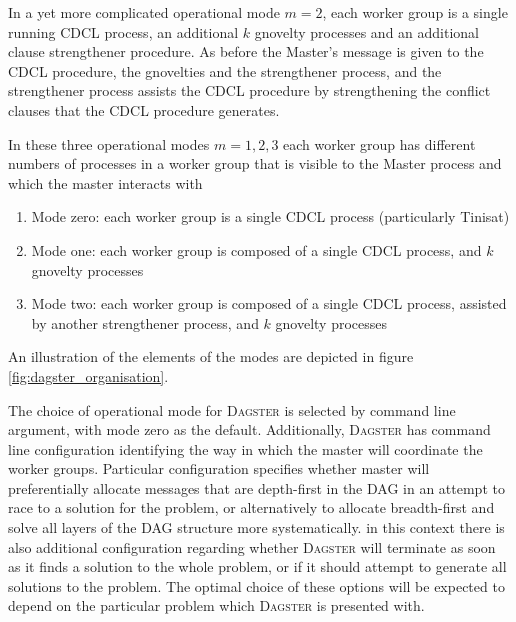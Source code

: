 \documentclass[
10pt, %
a4paper, %
oneside, %
headinclude,footinclude, %
BCOR5mm, %
]{scrartcl}
\begin{document}
In a yet more complicated operational mode $m=2$, each worker group is a single running CDCL process, an additional $k$ gnovelty processes and an additional clause strengthener procedure.
As before the Master's message is given to the CDCL procedure, the gnovelties and the strengthener process, and the strengthener process assists the CDCL procedure by strengthening
the conflict clauses that the CDCL procedure generates.

In these three operational modes $m=1,2,3$ each worker group has different numbers of processes in a worker group that is visible to the Master process and which the master interacts with

\begin{enumerate}
\item	Mode zero: each worker group is a single CDCL process (particularly Tinisat)
\item	Mode one: each worker group is composed of a single CDCL process, and $k$ gnovelty processes
\item	Mode two: each worker group is composed of a single CDCL process, assisted by another strengthener process, and $k$ gnovelty processes
\end{enumerate}

An illustration of the elements of the modes are depicted in figure \ref{fig:dagster_organisation}.

The choice of operational mode for \textsc{Dagster} is selected by command line argument, with mode zero as the default.
Additionally, \textsc{Dagster} has command line configuration identifying the way in which the master will coordinate the worker groups.
Particular configuration specifies whether master will preferentially allocate messages that are depth-first in the DAG in an attempt to race to a solution for the problem, 
or alternatively to allocate breadth-first and solve all layers of the DAG structure more systematically.
in this context there is also additional configuration regarding whether \textsc{Dagster} will terminate as soon as it finds a solution to the whole problem, or if it should attempt to generate
all solutions to the problem.
The optimal choice of these options will be expected to depend on the particular problem which \textsc{Dagster} is presented with.
\end{document}
